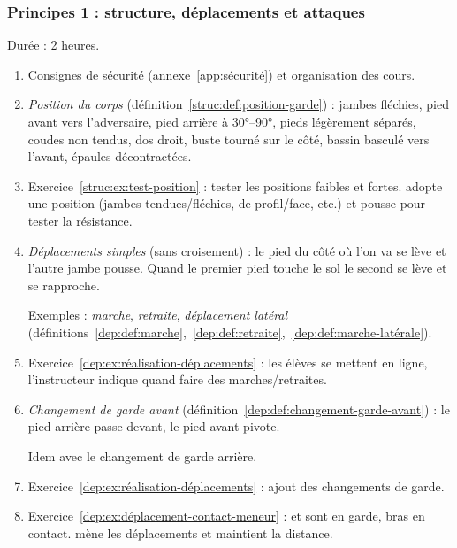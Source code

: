 \subsubsection{Principes 1 : structure, déplacements et attaques}


Durée : 2 heures.


\begin{enumerate}
	\item Consignes de sécurité (annexe~\ref{app:sécurité}) et organisation des cours.
	
	\item \emph{Position du corps} (définition~\ref{struc:def:position-garde}) : jambes fléchies, pied avant vers l'adversaire, pied arrière à \ang{30}--\ang{90}, pieds légèrement séparés, coudes non tendus, dos droit, buste tourné sur le côté, bassin basculé vers l'avant, épaules décontractées.
	
	\item Exercice~\ref{struc:ex:test-position} : tester les positions faibles et fortes.
	\D adopte une position (jambes tendues/fléchies, de profil/face, etc.) et \A pousse pour tester la résistance.
	
	\item \emph{Déplacements simples} (sans croisement) : le pied du côté où l'on va se lève et l'autre jambe pousse.
	Quand le premier pied touche le sol le second se lève et se rapproche.
	
	Exemples : \emph{marche}, \emph{retraite}, \emph{déplacement latéral} (définitions~\ref{dep:def:marche},~\ref{dep:def:retraite},~\ref{dep:def:marche-latérale}).
	
	\item Exercice~\ref{dep:ex:réalisation-déplacements} : les élèves se mettent en ligne, l'instructeur indique quand faire des marches/retraites.
	
	\item \emph{Changement de garde avant} (définition~\ref{dep:def:changement-garde-avant}) : le pied arrière passe devant, le pied avant pivote.
	
	Idem avec le changement de garde arrière.
	
	\item Exercice~\ref{dep:ex:réalisation-déplacements} : ajout des changements de garde.
	
	\item Exercice~\ref{dep:ex:déplacement-contact-meneur} : \A et \D sont en garde, bras en contact.
	\A mène les déplacements et \D maintient la distance.
	

\end{enumerate}

